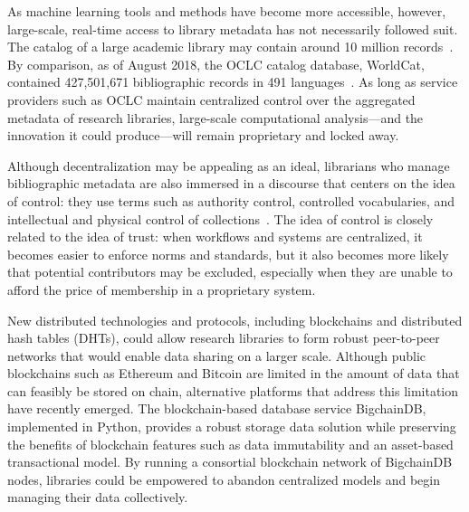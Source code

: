 As machine learning tools and methods have become more accessible,
however, large-scale, real-time access to library metadata has not
necessarily followed suit. The catalog of a large academic library may
contain around 10 million records~\cite{yul18}. By comparison, as of August
2018, the OCLC catalog database, WorldCat, contained 427,501,671
bibliographic records in 491 languages~\cite{oclc18}. As long as service
providers such as OCLC maintain centralized control over the aggregated
metadata of research libraries, large-scale computational analysis---and the
innovation it could produce---will remain proprietary and locked away.

Although decentralization may be appealing as an ideal, librarians who
manage bibliographic metadata are also immersed in a discourse that centers on
the idea of control: they use terms such as authority control, controlled
vocabularies, and intellectual and physical control of
collections~\cite{olson01}. The idea of control is closely related to the
idea of trust: when workflows and systems are centralized, it becomes easier
to enforce norms and standards, but it also becomes more likely that
potential contributors may be excluded, especially when they are unable to
afford the price of membership in a proprietary system.

﻿New distributed technologies and protocols, including blockchains and
distributed hash tables (DHTs), could allow research libraries to form
robust peer-to-peer networks that would enable data sharing on a larger
scale. Although public blockchains such as Ethereum and Bitcoin are limited
in the amount of data that can feasibly be stored on chain, alternative
platforms that address this limitation have recently emerged. The
blockchain-based database service BigchainDB, implemented in Python,
provides a robust storage data solution while preserving the benefits of
blockchain features such as data immutability and an asset-based
transactional model. By running a consortial blockchain network of
BigchainDB nodes, libraries could be empowered to abandon centralized models
and begin managing their data collectively.



